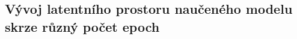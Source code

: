 \begin{landscape}
    \chapter{Vývoj latentního prostoru naučeného modelu skrze různý počet epoch}
    \label{app:latent_space_development}

    \begin{figure}[H]
        \centering

\end{figure}
\end{landscape}
